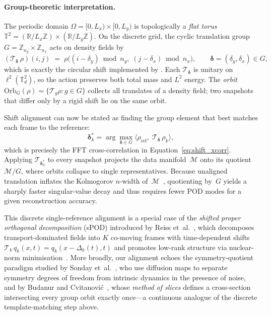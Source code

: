 \documentclass{report}
\theoremstyle{plain}
\theoremstyle{remark}
\numberwithin{equation}{section}              %
\begin{document}
\paragraph{Group-theoretic interpretation.}
The periodic domain $\Omega=[0,L_x)\times[0,L_y)$ is topologically a
\emph{flat torus}
$\mathbb{T}^2=(\mathbb{R}/L_x\mathbb{Z})\times(\mathbb{R}/L_y\mathbb{Z})$.
On the discrete grid, the cyclic translation group
$G=\mathbb{Z}_{n_y}\times\mathbb{Z}_{n_x}$ acts on density fields by
\[
  (\mathcal{T}_{\boldsymbol{\delta}}\,\rho)(i,j)
  \;=\;
  \rho\!\bigl((i-\delta_y)\bmod n_y,\;(j-\delta_x)\bmod n_x\bigr),
  \qquad
  \boldsymbol{\delta}=(\delta_y,\delta_x)\in G,
\]
which is exactly the circular shift implemented by .  Each
$\mathcal{T}_{\boldsymbol{\delta}}$ is unitary on
$\ell^2(\mathbb{T}^2_d)$, so the action preserves both total mass and
$L^2$ energy.  The \emph{orbit}
$\mathrm{Orb}_G(\rho)=\{\mathcal{T}_g\rho:g\in G\}$ collects all
translates of a density field; two snapshots that differ only by a rigid
shift lie on the same orbit.

Shift alignment can now be stated as finding the group element that best
matches each frame to the reference:
\[
  \boldsymbol{\delta}_k^*
  = \arg\max_{\boldsymbol{\delta}\in G}
    \bigl\langle \rho_{\mathrm{ref}},\;
    \mathcal{T}_{\boldsymbol{\delta}}\,\rho_k\bigr\rangle,
\]
which is precisely the FFT cross-correlation in
Equation~\eqref{eq:shift_xcorr}.  Applying
$\mathcal{T}_{\boldsymbol{\delta}_k^*}$ to every snapshot
projects the data manifold~$\mathcal{M}$ onto its quotient
$\mathcal{M}/G$, where orbits collapse to single representatives.  Because
unaligned translation inflates the Kolmogorov $n$-width
of~$\mathcal{M}$~\cite{peherstorfer2022kolmogorov},
quotienting by~$G$ yields a sharply faster singular-value decay and thus
requires fewer POD modes for a given reconstruction accuracy.

This discrete single-reference alignment is a special case of the
\emph{shifted proper orthogonal decomposition} (sPOD) introduced by
Reiss et~al.~\cite{reiss2018shifted_pod}, which decomposes
transport-dominated fields into $K$ co-moving frames with time-dependent
shifts $\mathcal{T}_k\,q_k(x,t)=q_k(x-\Delta_k(t),t)$ and promotes
low-rank structure via nuclear-norm
minimisation~\cite{krah2024robust_spod,black2020projection}.
More broadly, our alignment echoes the symmetry-quotient paradigm
studied by Sonday et~al.~\cite{sonday2011alignment}, who use diffusion
maps to separate symmetry degrees of freedom from intrinsic dynamics in
the presence of noise, and by Budanur and
Cvitanovi\'{c}~\cite{budanur2015slices,siminos2015periodic}, whose
\emph{method of slices} defines a cross-section intersecting every
group orbit exactly once---a continuous analogue of the discrete
template-matching step above.
\end{document}
